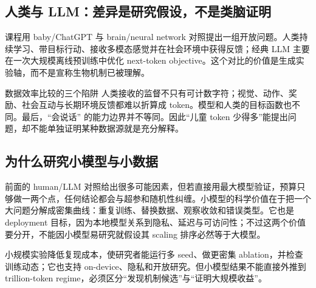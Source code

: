 \subsection{人类与 LLM：差异是研究假设，不是类脑证明}

课程用 baby/ChatGPT 与 brain/neural network 对照提出一组开放问题。人类持续学习、带目标行动、接收多模态感觉并在社会环境中获得反馈；经典 LLM 主要在一次大规模离线预训练中优化 next-token objective。这个对比的价值是生成实验轴，而不是宣称生物机制已被理解。






\begin{warningbox}{数据效率比较的三个陷阱}
人类接收的监督不只有可计数字符；视觉、动作、奖励、社会互动与长期环境反馈都难以折算成 token。模型和人类的目标函数也不同。最后，``会说话'' 的能力边界并不等同。因此“儿童 token 少得多”能提出问题，却不能单独证明某种数据源就是充分解释。
\end{warningbox}





\subsection{为什么研究小模型与小数据}

前面的 human/LLM 对照给出很多可能因素，但若直接用最大模型验证，预算只够做一两个点，任何结论都会与超参和随机性纠缠。小模型的科学价值在于把一个大问题分解成密集曲线：重复训练、替换数据、观察收敛和错误类型。它也是 deployment 目标，因为本地模型关系到隐私、延迟与可访问性；不过这两个价值要分开，不能因小模型易研究就假设其 scaling 排序必然等于大模型。

小规模实验降低复现成本，使研究者能运行多 seed、做更密集 ablation，并检查训练动态；它也支持 on-device、隐私和开放研究。但小模型结果不能直接外推到 trillion-token regime，必须区分“发现机制候选”与“证明大规模收益”。


